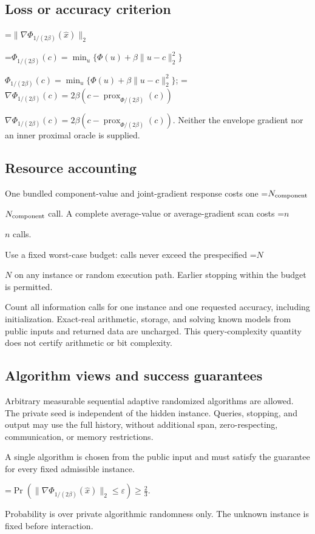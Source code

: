 \documentclass[10pt,a4paper]{article}
\newcommand{\AtlasMath}[1]{\par\begingroup\centering\setbox0=\hbox{$\displaystyle #1$}\ifdim\wd0>1.4\linewidth\typeout{ATLAS WIDE FORMULA: \the\wd0}\fi\ifdim\wd0>\linewidth\resizebox{\linewidth}{!}{\box0}\else\box0\fi\par\endgroup}
\newcommand{\AtlasInlineMath}[1]{\begingroup\setbox0=\hbox{$#1$}\ifdim\wd0>.4\linewidth\endgroup\AtlasMath{#1}\else\endgroup$#1$\fi}
\begin{document}
\subsection{Loss or accuracy criterion}

\AtlasMath{\|\nabla\Phi_{1/(2\beta)}(\widehat{x})\|_2}


\AtlasInlineMath{\Phi_{1/(2\beta)}(c)=\min_u\{\Phi(u)+\beta\|u-c\|_2^2\}}; \AtlasInlineMath{\nabla\Phi_{1/(2\beta)}(c)=2\beta(c-\operatorname{prox}_{\Phi/(2\beta)}(c))}. Neither the envelope gradient nor an inner proximal oracle is supplied.

\subsection{Resource accounting}
One bundled component-value and joint-gradient response costs one \AtlasInlineMath{N_{\rm component}} call. A complete average-value or average-gradient scan costs \AtlasInlineMath{n} calls.

Use a fixed worst-case budget: calls never exceed the prespecified \AtlasInlineMath{N} on any instance or random execution path. Earlier stopping within the budget is permitted.

Count all information calls for one instance and one requested accuracy, including initialization. Exact-real arithmetic, storage, and solving known models from public inputs and returned data are uncharged. This query-complexity quantity does not certify arithmetic or bit complexity.

\subsection{Algorithm views and success guarantees}
Arbitrary measurable sequential adaptive randomized algorithms are allowed. The private seed is independent of the hidden instance. Queries, stopping, and output may use the full history, without additional span, zero-respecting, communication, or memory restrictions.

A single algorithm is chosen from the public input and must satisfy the guarantee for every fixed admissible instance.


\AtlasMath{\Pr\!\left(\|\nabla\Phi_{1/(2\beta)}(\widehat{x})\|_2\le\varepsilon\right)\ge\frac23.}


Probability is over private algorithmic randomness only. The unknown instance is fixed before interaction.
\end{document}
